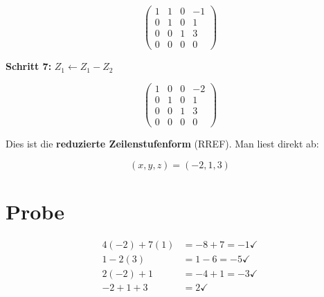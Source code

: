 \documentclass[a4paper,12pt]{article}
\begin{document}
\[
\left(\begin{array}{ccc|c}
1 & 1 & 0 & -1 \\
0 & 1 & 0 & 1 \\
0 & 0 & 1 & 3 \\
0 & 0 & 0 & 0
\end{array}\right)
\]

\textbf{Schritt 7:} $Z_1 \leftarrow Z_1 - Z_2$

\[
\left(\begin{array}{ccc|c}
1 & 0 & 0 & -2 \\
0 & 1 & 0 & 1 \\
0 & 0 & 1 & 3 \\
0 & 0 & 0 & 0
\end{array}\right)
\]

Dies ist die \textbf{reduzierte Zeilenstufenform} (RREF). Man liest direkt ab:

\[
\boxed{(x, y, z) = (-2, 1, 3)}
\]

\section*{Probe}

\begin{align*}
4(-2) + 7(1) &= -8 + 7 = -1 \checkmark \\
1 - 2(3) &= 1 - 6 = -5 \checkmark \\
2(-2) + 1 &= -4 + 1 = -3 \checkmark \\
-2 + 1 + 3 &= 2 \checkmark
\end{align*}
\end{document}
